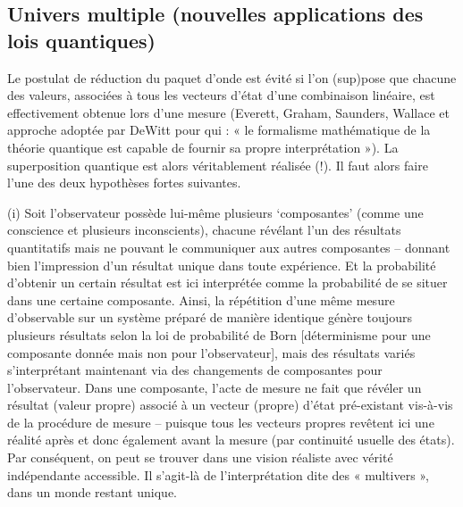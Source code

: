 \subsection{Univers multiple (nouvelles applications des lois quantiques)}
Le postulat de réduction du paquet d’onde est évité si l’on (sup)pose que chacune des
valeurs, associées à tous les vecteurs d’état d’une combinaison linéaire, est effectivement
obtenue lors d’une mesure (Everett, Graham, Saunders, Wallace et approche adoptée par
DeWitt pour qui : « le formalisme mathématique de la théorie quantique est capable de
fournir sa propre interprétation »). La superposition quantique est alors véritablement
réalisée (!). Il faut alors faire l’une des deux hypothèses fortes suivantes.

(i) Soit l’observateur possède lui-même plusieurs ‘composantes’ (comme une conscience
et plusieurs inconscients), chacune révélant l’un des résultats quantitatifs mais ne pouvant le
communiquer aux autres composantes – donnant bien l’impression d’un résultat unique dans
toute expérience. Et la probabilité d’obtenir un certain résultat est ici interprétée comme la
probabilité de se situer dans une certaine composante. Ainsi, la répétition d’une même
mesure d’observable sur un système préparé de manière identique génère toujours plusieurs
résultats selon la loi de probabilité de Born [déterminisme pour une composante donnée
mais non pour l’observateur], mais des résultats variés s’interprétant maintenant via des
changements de composantes pour l’observateur. Dans une composante, l’acte de mesure ne
fait que révéler un résultat (valeur propre) associé à un vecteur (propre) d’état pré-existant
vis-à-vis de la procédure de mesure – puisque tous les vecteurs propres revêtent ici une
réalité après et donc également avant la mesure (par continuité usuelle des états). Par
conséquent, on peut se trouver dans une vision réaliste avec vérité indépendante accessible.
Il s’agit-là de l’interprétation dite des « multivers », dans un monde restant unique.

